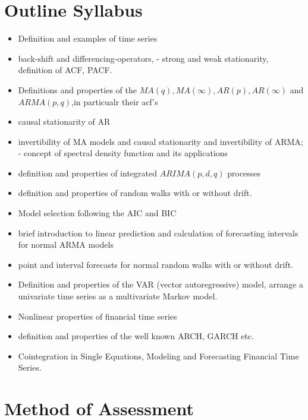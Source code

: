 \documentclass[]{book}
\providecommand{\tightlist}{%
  \setlength{\itemsep}{0pt}\setlength{\parskip}{0pt}}
\begin{document}
\hypertarget{outline-syllabus}{%
\section*{Outline Syllabus}\label{outline-syllabus}}

\begin{itemize}
\tightlist
\item
  Definition and examples of time series
\item
  back-shift and differencing-operators, - strong and weak stationarity, definition of ACF, PACF.
\item
  Definitions and properties of the \(MA(q), MA(\infty), AR(p), AR(\infty)\)
  and \(ARMA(p,q)\),in particualr their acf's
\item
  causal stationarity of AR
\item
  invertibility of MA models and causal stationarity and invertibility of ARMA; - concept of spectral density function and its applications
\item
  definition and properties of integrated \(ARIMA(p,d,q)\) processes
\item
  definition and properties of random walks with or without drift.
\item
  Model selection following the AIC and BIC
\item
  brief introduction to linear prediction and calculation of forecasting intervals for normal ARMA models
\item
  point and interval forecasts for normal random walks with or without drift.
\item
  Definition and properties of the VAR (vector autoregressive) model, arrange a univariate time series as a multivariate Markov model.
\item
  Nonlinear properties of financial time series
\item
  definition and properties of the well known ARCH, GARCH etc.
\item
  Cointegration in Single Equations, Modeling and Forecasting Financial Time Series.
\end{itemize}

\hypertarget{method-of-assessment}{%
\section*{Method of Assessment}\label{method-of-assessment}}
\end{document}
